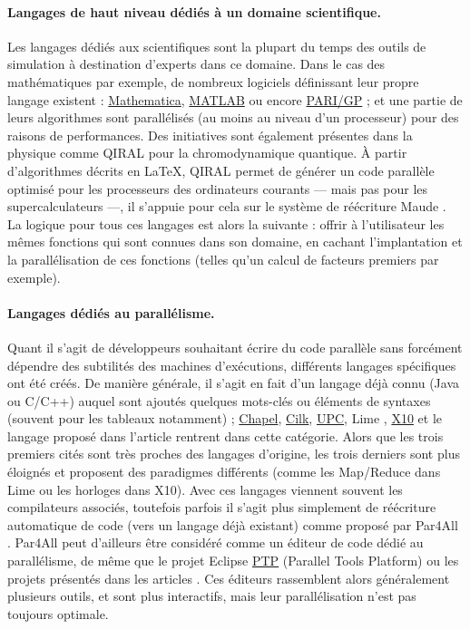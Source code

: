 \paragraph{Langages de haut niveau dédiés à un domaine scientifique.}
Les langages dédiés aux scientifiques sont la plupart du temps des outils de simulation à destination d'experts dans ce domaine. Dans le cas des mathématiques par exemple, de nombreux logiciels définissant leur propre langage existent : \textsf{\href{http://www.wolfram.com/mathematica/}{Mathematica}}, \textsf{\href{http://fr.mathworks.com/}{MATLAB}} ou encore \textsf{\href{http://pari.math.u-bordeaux.fr/}{PARI/GP}} ; et une partie de leurs algorithmes sont parallélisés (au moins au niveau d'un processeur) pour des raisons de performances. Des initiatives sont également présentes dans la physique comme \textsf{QIRAL} \cite{Art13,Art14} pour la chromodynamique quantique. À partir d'algorithmes décrits en \LaTeX, \textsf{QIRAL} permet de générer un code parallèle optimisé pour les processeurs des ordinateurs courants --- mais pas pour les supercalculateurs ---, il s'appuie pour cela sur le système de réécriture \textsf{Maude} \cite{Art12}. La logique pour tous ces langages est alors la suivante : offrir à l'utilisateur les mêmes fonctions qui sont connues dans son domaine, en cachant l'implantation et la parallélisation de ces fonctions (telles qu'un calcul de facteurs premiers par exemple).

\paragraph{Langages dédiés au parallélisme.}
Quant il s'agit de développeurs souhaitant écrire du code parallèle sans forcément dépendre des subtilités des machines d'exécutions, différents langages spécifiques ont été créés. De manière générale, il s'agit en fait d'un langage déjà connu (\textsf{Java} ou \textsf{C/C++}) auquel sont ajoutés quelques mots-clés ou éléments de syntaxes (souvent pour les tableaux notamment) ; \textsf{\href{http://chapel.cray.com/}{Chapel}}, \textsf{\href{https://www.cilkplus.org/}{Cilk}}, \textsf{\href{http://upc.lbl.gov/}{UPC}}, \textsf{Lime} \cite{Art8}, \textsf{\href{http://x10-lang.org/}{X10}} et le langage proposé dans l'article \cite{Art10} rentrent dans cette catégorie. Alors que les trois premiers cités sont très proches des langages d'origine, les trois derniers sont plus éloignés et proposent des paradigmes différents (comme les Map/Reduce dans \textsf{Lime} ou les horloges dans \textsf{X10}). Avec ces langages viennent souvent les compilateurs associés, toutefois parfois il s'agit plus simplement de réécriture automatique de code (vers un langage déjà existant) comme proposé par \textsf{Par4All} \cite{Ths2}. \textsf{Par4All} peut d'ailleurs être considéré comme un éditeur de code dédié au parallélisme, de même que le projet \textsf{Eclipse \href{http://www.eclipse.org/ptp/}{PTP}} (Parallel Tools Platform) ou les projets présentés dans les articles \cite{Art23,Art25}. Ces éditeurs rassemblent alors généralement plusieurs outils, et sont plus interactifs, mais leur parallélisation n'est pas toujours optimale.

